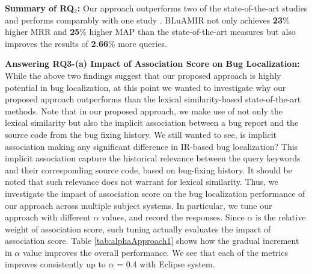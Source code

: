 \documentclass[sigconf,review,anonymous]{acmart}
\begin{document}
\begin{framed}
	\noindent
	\textbf{Summary of RQ$_2$:} Our approach outperforms two of the state-of-the-art studies \cite{Nguyen,Jian} and performs comparably with one study \cite{Saha}. BLuAMIR not only achieves \textbf{23}\% higher MRR and \textbf{25}\% higher MAP than the state-of-the-art measures but also improves the results of \textbf{2.66}\% more queries.
\end{framed}

\textbf{Answering RQ3-(a) Impact of Association Score on Bug Localization:} 
While the above two findings suggest that our proposed approach is highly potential in bug localization, at this point we wanted to investigate why our proposed approach outperforms than the lexical similarity-based state-of-the-art methods. 
Note that in our proposed approach, we make use of not only the lexical similarity but also the implicit association between a bug report and the source code from the bug fixing history. We still wanted to see, is implicit association making any significant difference in IR-based bug localization? 
This implicit association capture the historical relevance between the query keywords and their corresponding source code, based on bug-fixing history. It should be noted that such relevance does not warrant for lexical similarity. 
Thus, we investigate the impact of association score on the bug localization performance of our approach across multiple subject systems. 
In particular, we tune our approach with different $\alpha$ values, and record the responses. Since $\alpha$ is the relative weight of association score, such tuning actually evaluates the impact of association score.  
Table \ref{tab:alphaApproach1} shows how the gradual increment in $\alpha$ value improves the overall performance. We see that each of the metrics improves consistently up to $\alpha$ = 0.4 with Eclipse system. 
\end{document}
